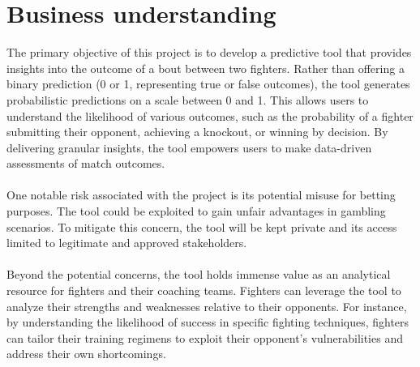 \documentclass{article}
\begin{document}
\section{Business understanding}
	The primary objective of this project is to develop a predictive tool that provides insights into the outcome of a bout between two fighters. 
	Rather than offering a binary prediction (0 or 1, representing true or false outcomes), the tool generates probabilistic predictions on a scale 
	between 0 and 1. This allows users to understand the likelihood of various outcomes, such as the probability of a fighter submitting their opponent, 
	achieving a knockout, or winning by decision. By delivering granular insights, the tool empowers users to make data-driven assessments of match 
	outcomes.\\\\
	One notable risk associated with the project is its potential misuse for betting purposes. The tool could be exploited to gain unfair advantages in gambling
	scenarios. To mitigate this concern, the tool will be kept private and its access limited to legitimate and approved stakeholders.\\\\
	Beyond the potential concerns, the tool holds immense value as an analytical resource for fighters and their coaching teams. Fighters can leverage
	the tool to analyze their strengths and weaknesses relative to their opponents. For instance, by understanding the likelihood of success in 
	specific fighting techniques, fighters can tailor their training regimens to exploit their opponent's vulnerabilities and address their own 
	shortcomings.
\end{document}
